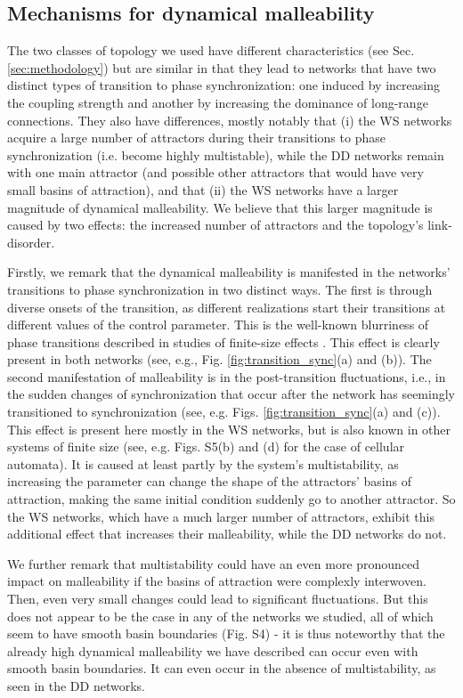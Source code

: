 \subsection{Mechanisms for dynamical malleability}
The two classes of topology we used have different characteristics (see Sec. \ref{sec:methodology}) but are similar in that they lead to networks that have two distinct types of transition to phase synchronization: one induced by increasing the coupling strength and another by increasing the dominance of long-range connections. They also have differences, mostly notably that (i) the WS networks acquire a large number of attractors during their transitions to phase synchronization (i.e. become highly multistable), while the DD networks remain with one main attractor (and possible other attractors that would have very small basins of attraction), and that (ii) the WS networks have a larger magnitude of dynamical malleability. We believe that this larger magnitude is caused by two effects: the increased number of attractors and the topology's link-disorder.

Firstly, we remark that the dynamical malleability is manifested in the networks' transitions to phase synchronization in two distinct ways. The first is through diverse onsets of the transition, as different realizations start their transitions at different values of the control parameter. This is the well-known blurriness of phase transitions described in studies of finite-size effects \cite{brankov2000theory, binder1987finite}. This effect is clearly present in both networks (see, e.g., Fig. \ref{fig:transition_sync}(a) and (b)). The second manifestation of malleability is in the post-transition fluctuations, i.e., in the sudden changes of synchronization that occur after the network has seemingly transitioned to synchronization (see, e.g. Figs. \ref{fig:transition_sync}(a) and (c)). This effect is present here mostly in the WS networks, but is also known in other systems of finite size (see, e.g. Figs. S5(b) and (d) for the case of cellular automata). It is caused at least partly by the system's multistability, as increasing the parameter can change the shape of the attractors' basins of attraction, making the same initial condition suddenly go to another attractor. So the WS networks, which have a much larger number of attractors, exhibit this additional effect that increases their malleability, while the DD networks do not.

We further remark that multistability could have an even more pronounced impact on malleability if the basins of attraction were complexly interwoven. Then, even very small changes could lead to significant fluctuations. But this does not appear to be the case in any of the networks we studied, all of which seem to have smooth basin boundaries (Fig. S4) - it is thus noteworthy that the already high dynamical malleability we have described can occur even with smooth basin boundaries. It can even occur in the absence of multistability, as seen in the DD networks.

